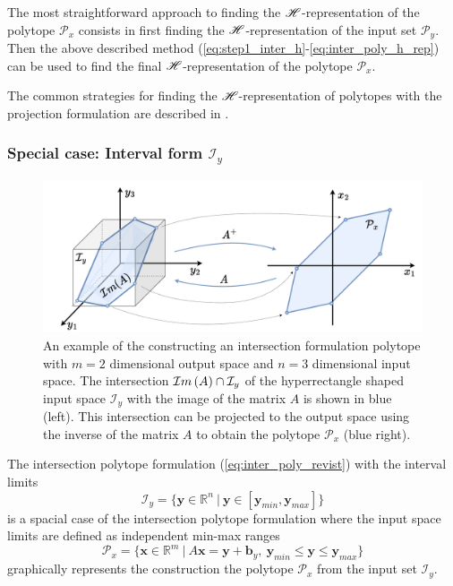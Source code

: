 The most straightforward approach to finding the $\mathscr{H}$-representation of the polytope $\mathcal{P}_x$ consists in first finding the $\mathscr{H}$-representation of the input set $\mathcal{P}_y$. Then the above described method  (\ref{eq:step1_inter_h}-\ref{eq:inter_poly_h_rep}) can be used to find the final $\mathscr{H}$-representation of the polytope $\mathcal{P}_x$.

The common strategies for finding the $\mathscr{H}$-representation of polytopes with the projection formulation are described in .

\subsubsection*{Special case: Interval form $\mathcal{I}_y$}  
\label{par:intersection_interval_algos_h}
\begin{figure}
    \centering
    \includegraphics[width=0.8\linewidth]{Chapters/imgs/intersection.pdf}
    \caption{An example of the constructing an intersection formulation polytope with $m=2$ dimensional output space and $n=3$ dimensional input space. The intersection $\mathcal{I}m\left(A\right) \cap \mathcal{I}_y$ of the hyperrectangle shaped input space $\mathcal{I}_y$ with the image of the matrix $A$ is shown in blue (left). This intersection can be projected to the output space using the inverse of the matrix $A$ to obtain the polytope $\mathcal{P}_x$ (blue right).}
    \label{fig:inter}
\end{figure}

The intersection polytope formulation (\ref{eq:inter_poly_revist}) with the interval limits 
\begin{equation}
    \mathcal{I}_y = \{ \bm{y}\in\mathbb{R}^n ~|~ \bm{y}\in[\bm{y}_{min},\bm{y}_{max}]\}
\end{equation}
is a spacial case of the intersection polytope formulation where the input space limits are defined as independent min-max ranges 
\begin{equation}
    \mathcal{P}_x=\{\bm{x}\in\mathbb{R}^m~ |~ A\bm{x} = \bm{y} + \bm{b}_y,~\bm{y}_{min} \leq  \bm{y} \leq \bm{y}_{max}  \}
    \label{eq:inter_hyp}
\end{equation}
 graphically represents the construction the polytope $\mathcal{P}_x$ from the input set $\mathcal{I}_y$.

